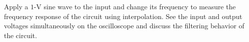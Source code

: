 \documentclass[11pt]{article}
\begin{document}
\begin{question}
    \begin{subquestion}{Apply a $1$-V sine wave to the input and change its frequency to measure the frequency response of the circuit using interpolation. See the input and output voltages simultaneously on the oscilloscope and discuss the filtering behavior of the circuit.}
    \end{subquestion}


\end{question}
\end{document}
